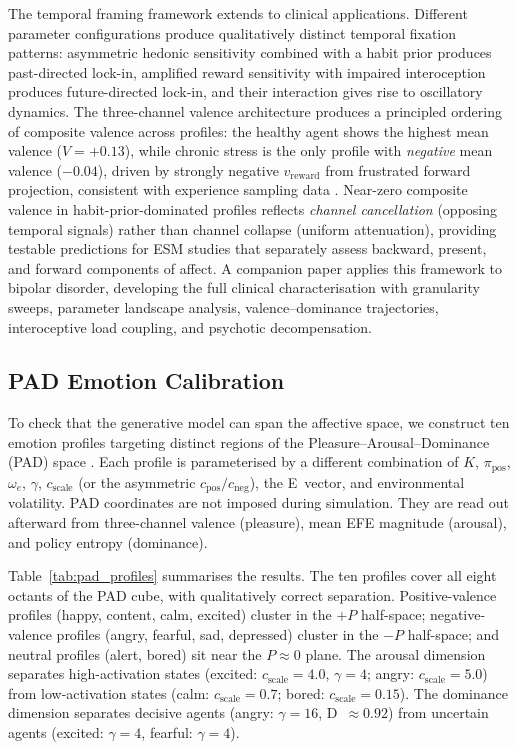 \documentclass[11pt,a4paper]{article}
\begin{document}
The temporal framing framework extends to clinical applications. Different parameter configurations produce qualitatively distinct temporal fixation patterns: asymmetric hedonic sensitivity combined with a habit prior produces past-directed lock-in, amplified reward sensitivity with impaired interoception produces future-directed lock-in, and their interaction gives rise to oscillatory dynamics. The three-channel valence architecture produces a principled ordering of composite valence across profiles: the healthy agent shows the highest mean valence ($V = +0.13$), while chronic stress is the only profile with \emph{negative} mean valence ($-0.04$), driven by strongly negative $v_{\text{reward}}$ from frustrated forward projection, consistent with experience sampling data \citep{wichers2010momentary}. Near-zero composite valence in habit-prior-dominated profiles reflects \emph{channel cancellation} (opposing temporal signals) rather than channel collapse (uniform attenuation), providing testable predictions for ESM studies that separately assess backward, present, and forward components of affect. A companion paper applies this framework to bipolar disorder, developing the full clinical characterisation with granularity sweeps, parameter landscape analysis, valence--dominance trajectories, interoceptive load coupling, and psychotic decompensation.

\subsection{PAD Emotion Calibration}\label{sec:pad_validation}

To check that the generative model can span the affective space, we construct ten emotion profiles targeting distinct regions of the Pleasure--Arousal--Dominance (PAD) space \citep{mehrabian1996pleasure, russell1980circumplex}. Each profile is parameterised by a different combination of $K$, $\pi_{\text{pos}}$, $\omega_e$, $\gamma$, $c_{\text{scale}}$ (or the asymmetric $c_{\text{pos}}/c_{\text{neg}}$), the E~vector, and environmental volatility. PAD coordinates are not imposed during simulation. They are read out afterward from three-channel valence (pleasure), mean EFE magnitude (arousal), and policy entropy (dominance).

Table~\ref{tab:pad_profiles} summarises the results. The ten profiles cover all eight octants of the PAD cube, with qualitatively correct separation. Positive-valence profiles (happy, content, calm, excited) cluster in the $+P$ half-space; negative-valence profiles (angry, fearful, sad, depressed) cluster in the $-P$ half-space; and neutral profiles (alert, bored) sit near the $P \approx 0$ plane. The arousal dimension separates high-activation states (excited: $c_{\text{scale}} = 4.0$, $\gamma = 4$; angry: $c_{\text{scale}} = 5.0$) from low-activation states (calm: $c_{\text{scale}} = 0.7$; bored: $c_{\text{scale}} = 0.15$). The dominance dimension separates decisive agents (angry: $\gamma = 16$, D~$\approx 0.92$) from uncertain agents (excited: $\gamma = 4$, fearful: $\gamma = 4$).
\end{document}
